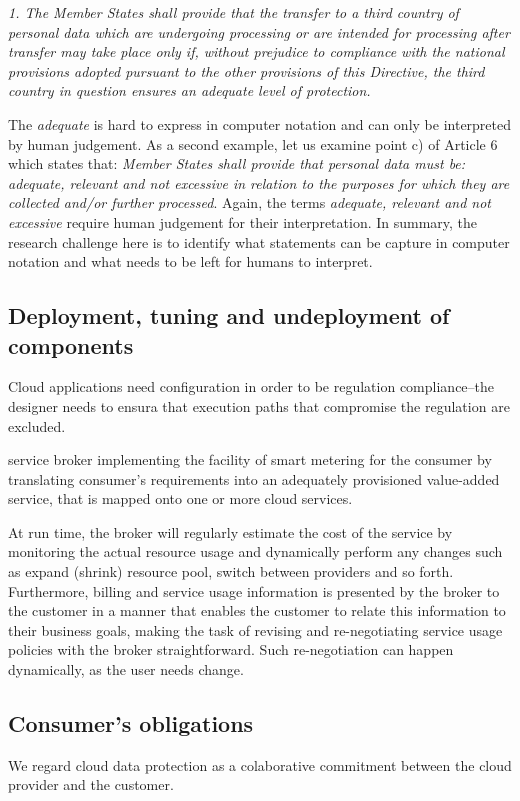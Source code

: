 \documentclass[runningheads,a4paper]{llncs}
\begin{document}
\emph{ 1. The Member States shall provide that the transfer to a third country of 
       personal data which are undergoing processing or are intended for processing 
       after transfer may take place only if, without prejudice to compliance with 
       the national provisions adopted pursuant to the other provisions of this 
       Directive, the third country in question ensures an adequate level of 
       protection.}

The \emph{adequate} is hard to express in computer notation and can only be
interpreted by human judgement. As a second example, let us examine 
point c) of Article 6 which states that:
\emph{Member States shall provide that personal data must be:
adequate, relevant and not excessive in relation to the purposes for 
which they are collected and/or further processed}. Again, 
the terms \emph{adequate, relevant and not excessive} require human
judgement for their interpretation.
In summary, the research challenge here is to identify what statements can
be capture in computer notation and what needs to be left for humans to
interpret.

\subsection{Deployment, tuning and undeployment of components}

Cloud applications need configuration in order to be regulation
compliance--the designer needs to ensura that execution paths
that compromise the regulation are excluded.

service broker implementing the facility of smart metering for the consumer by
translating consumer’s requirements into an adequately provisioned value-added service, that is mapped
onto one or more cloud services. 

At run time, the broker will regularly estimate the cost of the service by
monitoring the actual resource usage and dynamically perform any changes such as expand (shrink)
resource pool, switch between providers and so forth. Furthermore, billing and service usage information is
presented by the broker to the customer in a manner that enables the customer to relate this information to
their business goals, making the task of revising and re-negotiating service usage policies with the broker
straightforward. Such re-negotiation can happen dynamically, as the user needs change.


\subsection{Consumer's obligations}
We regard cloud data protection as a colaborative commitment between the
cloud provider and the customer. 
\end{document}
